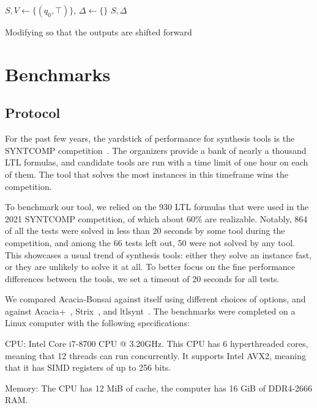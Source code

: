 \documentclass[runningheads,a4paper]{llncs}
\begin{document}
\begin{algorithm}[H]

\BlankLine
\(S,V \leftarrow \{(q_0,\top)\}\), \(\Delta \leftarrow \{\}\)\;
\Return \(S,\Delta\)
\caption{Modifying \cA so that the outputs are shifted forward}
\label{alg:caddys-madness}
\end{algorithm}

\section{Benchmarks}\label{sec:benchmarks}

\subsection{Protocol}

For the past few years, the yardstick of performance for synthesis tools is the
SYNTCOMP competition~\cite{syntcomp17}.  The organizers provide a bank of nearly a
thousand LTL formulas, and candidate tools are run with a time limit of one hour
on each of them.  The tool that solves the most instances in this timeframe wins
the competition.

To benchmark our tool, we relied on the 930 LTL formulas that were used in the
2021 SYNTCOMP competition, of which about 60\% are realizable.  Notably, 864 of
all the tests were solved in less than 20 seconds by some tool during the
competition, and among the 66 tests left out, 50 were not solved by any tool.
This showcases a usual trend of synthesis tools: either they solve an instance
fast, or they are unlikely to solve it at all.  To better focus on the fine
performance differences between the tools, we set a timeout of 20 seconds for
all tests.

We compared Acacia-Bonsai against itself using different choices of options, and
against Acacia+~\cite{bbfjr12}, Strix~\cite{msl18}, and
ltlsynt~\cite{duret.16.atva2}.  The benchmarks were completed on a
Linux computer with the following specifications:
\begin{compactitem}
\item CPU: Intel\textregistered{} Core\texttrademark{} i7-8700 CPU @ 3.20GHz.  This CPU
  has 6 hyperthreaded cores, meaning that 12 threads can run concurrently.  It
  supports Intel\textregistered{} AVX2, meaning that it has SIMD registers of up to
  256 bits.
\item Memory: The CPU has 12 MiB of cache, the computer has 16 GiB of DDR4-2666
  RAM.
\end{compactitem}
\end{document}
